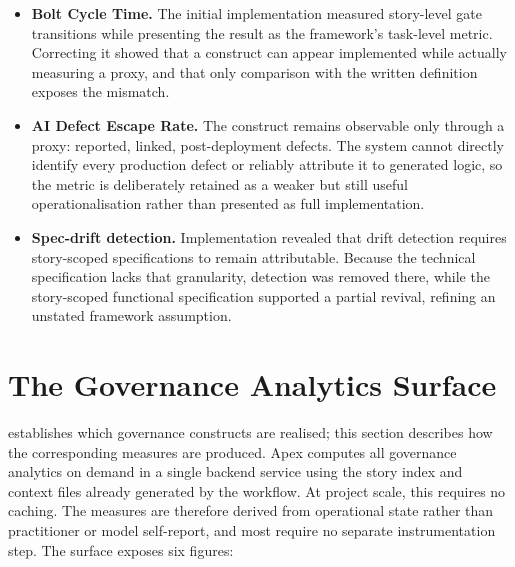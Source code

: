 \begin{itemize}[leftmargin=0.6cm, itemsep=0.4em]

\item \textbf{Bolt Cycle Time.} The initial implementation measured story-level gate transitions while presenting the result as the framework's task-level metric. Correcting it showed that a construct can appear implemented while actually measuring a proxy, and that only comparison with the written definition exposes the mismatch.

\item \textbf{AI Defect Escape Rate.} The construct remains observable only through a proxy: reported, linked, post-deployment defects. The system cannot directly identify every production defect or reliably attribute it to generated logic, so the metric is deliberately retained as a weaker but still useful operationalisation rather than presented as full implementation.

\item \textbf{Spec-drift detection.} Implementation revealed that drift detection requires story-scoped specifications to remain attributable. Because the technical specification lacks that granularity, detection was removed there, while the story-scoped functional specification supported a partial revival, refining an unstated framework assumption.

\end{itemize}

\section{The Governance Analytics Surface}
\label{sec:apex_analytics}


 establishes which governance constructs are realised; this section describes how the corresponding measures are produced. Apex computes all governance analytics on demand in a single backend service using the story index and context files already generated by the workflow. At project scale, this requires no caching. The measures are therefore derived from operational state rather than practitioner or model self-report, and most require no separate instrumentation step. The surface exposes six figures:

